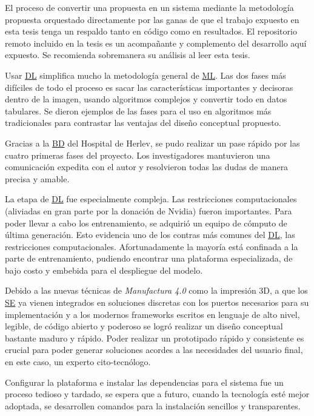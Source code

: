 El proceso de convertir una propuesta en un sistema mediante la metodología
propuesta orquestado directamente por las ganas de que el trabajo expuesto en
esta tesis tenga un respaldo tanto en código como en resultados. El repositorio
remoto incluido en la tesis es un acompañante y complemento del desarrollo aquí
expuesto. Se recomienda sobremanera su análisis al leer esta tesis.

Usar \hyperlink{abbr}{DL} simplifica mucho la metodología general de
\hyperlink{abbr}{ML}. Las dos fases más difíciles de todo el proceso es sacar
las características importantes y decisoras dentro de la imagen, usando
algoritmos complejos y convertir todo en datos tabulares. Se dieron ejemplos de
las fases para el uso en algoritmos más tradicionales para contrastar las
ventajas del diseño conceptual propuesto.

Gracias a la \hyperlink{abbr}{BD} del Hospital de Herlev, se pudo realizar un
pase rápido por las cuatro primeras fases del proyecto. Los investigadores
mantuvieron una comunicación expedita con el autor y resolvieron todas las dudas
de manera precisa y amable. 

La etapa de \hyperlink{abbr}{DL} fue especialmente compleja. Las restricciones
computacionales (aliviadas en gran parte por la donación de Nvidia) fueron
importantes. Para poder llevar a cabo los entrenamiento, se adquirió un equipo
de cómputo de última generación. Esto evidencia uno de los contras más comunes
del \hyperlink{abbr}{DL}, las restricciones computacionales. Afortunadamente la
mayoría está confinada a la parte de entrenamiento, pudiendo encontrar una
plataforma especializada, de bajo costo y embebida para el despliegue del
modelo.

Debido a las nuevas técnicas de \emph{Manufactura 4.0} como la impresión 3D, a
que los \hyperlink{abbr}{SE} ya vienen integrados en soluciones discretas con
los puertos necesarios para su implementación y a los modernos frameworks
escritos en lenguaje de alto nivel, legible, de código abierto y poderoso se
logró realizar un diseño conceptual bastante maduro y rápido. Poder realizar un
prototipado rápido y consistente es crucial para poder generar soluciones
acordes a las necesidades del usuario final, en este caso, un experto
cito-tecnólogo.

Configurar la plataforma e instalar las dependencias para el sistema fue un
proceso tedioso y tardado, se espera que a futuro, cuando la tecnología esté
mejor adoptada, se desarrollen comandos para la instalación sencillos y
transparentes. 

